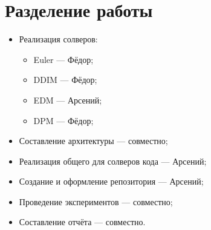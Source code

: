 \documentclass[a4paper]{article}
\begin{document}
    \section{Разделение работы}
    \begin{itemize}
        \item Реализация солверов:
            \begin{itemize}
                \item Euler --- Фёдор;
                \item DDIM --- Фёдор;
                \item EDM --- Арсений;
                \item DPM --- Фёдор;
            \end{itemize}
        \item Составление архитектуры --- совместно;
        \item Реализация общего для солверов кода --- Арсений;
        \item Создание и оформление репозитория --- Арсений;
        \item Проведение экспериментов --- совместно;
        \item Составление отчёта --- совместно.
    \end{itemize}
\end{document}
